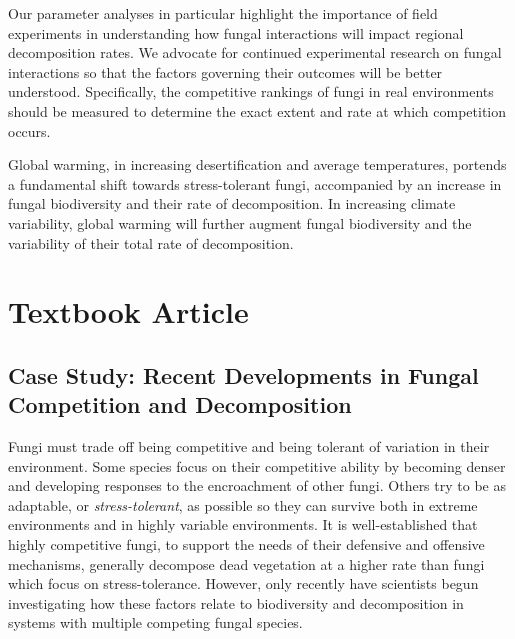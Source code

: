 \documentclass[12pt]{article}
\begin{document}
Our parameter analyses in particular highlight the importance of field experiments in understanding how fungal interactions will impact regional decomposition rates. We advocate for continued experimental research on fungal interactions so that the factors governing their outcomes will be better understood. Specifically, the competitive rankings of fungi in real environments should be measured to determine the exact extent and rate at which competition occurs.

Global warming, in increasing desertification and average temperatures, portends a fundamental shift towards stress-tolerant fungi, accompanied by an increase in fungal biodiversity and their rate of decomposition. In increasing climate variability, global warming will further augment fungal biodiversity and the variability of their total rate of decomposition.





\small


\normalsize
\setcounter{secnumdepth}{-1}
\newpage
\section{Textbook Article}

\subsection*{Case Study: Recent Developments in Fungal Competition and Decomposition}

Fungi must trade off being competitive and being tolerant of variation in their environment. Some species focus on their competitive ability by becoming denser and developing responses to the encroachment of other fungi. Others try to be as adaptable, or \textit{stress-tolerant}, as possible so they can survive both in extreme environments and in highly variable environments. It is well-established that highly competitive fungi, to support the needs of their defensive and offensive mechanisms, generally decompose dead vegetation at a higher rate than fungi which focus on stress-tolerance. However, only recently have scientists begun investigating how these factors relate to biodiversity and decomposition in systems with multiple competing fungal species.
\end{document}
